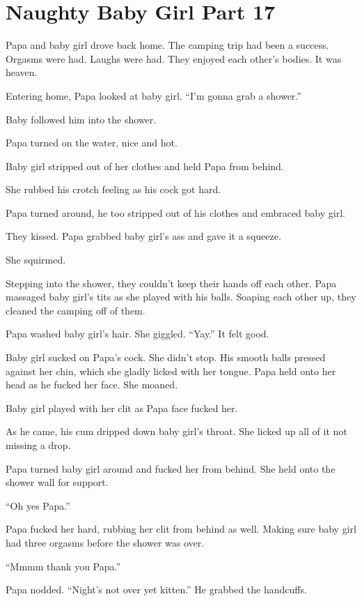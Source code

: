 \section{Naughty Baby Girl Part 17}

     Papa and baby girl drove back home. The camping trip had been a success. Orgasms were had. Laughs were had. They enjoyed each other’s bodies. It was heaven.

     Entering home, Papa looked at baby girl. “I’m gonna grab a shower.”

     Baby followed him into the shower.

     Papa turned on the water, nice and hot.

     Baby girl stripped out of her clothes and held Papa from behind.

     She rubbed his crotch feeling as his cock got hard.

     Papa turned around, he too stripped out of his clothes and embraced baby girl.

     They kissed. Papa grabbed baby girl’s ass and gave it a squeeze.

     She squirmed.

     Stepping into the shower, they couldn’t keep their hands off each other. Papa massaged baby girl’s tits as she played with his balls. Soaping each other up, they cleaned the camping off of them.

     Papa washed baby girl’s hair. She giggled. “Yay.” It felt good.

     Baby girl sucked on Papa’s cock. She didn’t stop. His smooth balls pressed against her chin, which she gladly licked with her tongue. Papa held onto her head as he fucked her face. She moaned.

     Baby girl played with her clit as Papa face fucked her.

     As he came, his cum dripped down baby girl’s throat. She licked up all of it not missing a drop.

     Papa turned baby girl around and fucked her from behind. She held onto the shower wall for support.

     “Oh yes Papa.”

     Papa fucked her hard, rubbing her clit from behind as well. Making sure baby girl had three orgasms before the shower was over.

     “Mmmm thank you Papa.”

     Papa nodded. “Night’s not over yet kitten.” He grabbed the handcuffs.


